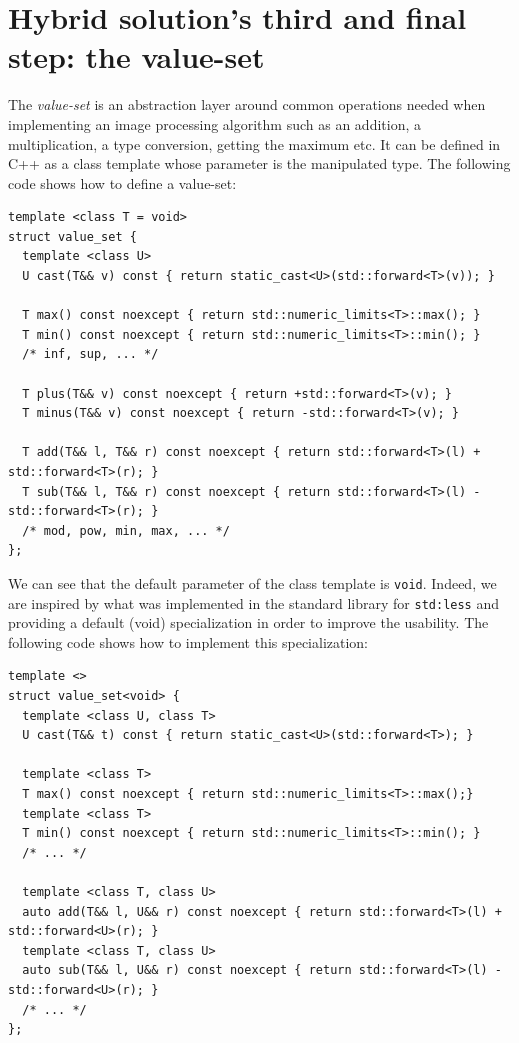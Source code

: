 \section{Hybrid solution's third and final step: the value-set}

The \emph{value-set} is an abstraction layer around common operations needed when implementing an image processing
algorithm such as an addition, a multiplication, a type conversion, getting the maximum etc. It can be defined in C++ as
a class template whose parameter is the manipulated type. The following code shows how to define a value-set:

\begin{verbatim}
template <class T = void>
struct value_set {
  template <class U>
  U cast(T&& v) const { return static_cast<U>(std::forward<T>(v)); }

  T max() const noexcept { return std::numeric_limits<T>::max(); }
  T min() const noexcept { return std::numeric_limits<T>::min(); }
  /* inf, sup, ... */

  T plus(T&& v) const noexcept { return +std::forward<T>(v); }
  T minus(T&& v) const noexcept { return -std::forward<T>(v); }

  T add(T&& l, T&& r) const noexcept { return std::forward<T>(l) + std::forward<T>(r); }
  T sub(T&& l, T&& r) const noexcept { return std::forward<T>(l) - std::forward<T>(r); }
  /* mod, pow, min, max, ... */
};
\end{verbatim}

We can see that the default parameter of the class template is \texttt{void}. Indeed, we are inspired by what was
implemented in the standard library for \texttt{std:less} and providing a default (void) specialization in order to
improve the usability. The following code shows how to implement this specialization:

\begin{verbatim}
template <>
struct value_set<void> {
  template <class U, class T>
  U cast(T&& t) const { return static_cast<U>(std::forward<T>); }

  template <class T>
  T max() const noexcept { return std::numeric_limits<T>::max();}
  template <class T>
  T min() const noexcept { return std::numeric_limits<T>::min(); }
  /* ... */

  template <class T, class U>
  auto add(T&& l, U&& r) const noexcept { return std::forward<T>(l) + std::forward<U>(r); }
  template <class T, class U>
  auto sub(T&& l, U&& r) const noexcept { return std::forward<T>(l) - std::forward<U>(r); }
  /* ... */
};
\end{verbatim}

